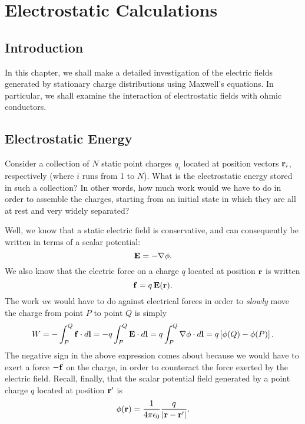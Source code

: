 \chapter{Electrostatic Calculations}\label{estat}

\section{Introduction}
In this chapter, we shall  make a detailed investigation of the
electric fields generated by stationary charge distributions using Maxwell's equations. In particular, we shall examine the interaction of electrostatic
fields with ohmic conductors.

\section{Electrostatic Energy}
Consider a collection of $N$ static point charges $q_i$  located at position vectors
${\bf r}_i$, respectively (where $i$ runs from 1 to $N$). 
What is the electrostatic energy stored in such a collection? In other words, how much work would we have to do in order to assemble
the charges, starting from an initial state in which they are all 
at rest and very widely
separated?

 Well, we know that a static electric field is conservative, and can  consequently
be written in terms of
a scalar potential:
\begin{equation}
{\bf E} = - \nabla\phi.
\end{equation}
We also know that the electric force on a charge $q$  located at position ${\bf r}$ is
written
\begin{equation}
{\bf f} = q\, {\bf E}({\bf r}).
\end{equation}
The work {\em we} would have to do against electrical forces in order to {\em slowly}\/
move the charge from point $P$ to point $Q$ is simply
\begin{equation}\label{e5.3}
W =-  \int_P^Q {\bf f} \cdot d{\bf l} =- q \int_P^Q {\bf E} \cdot d{\bf l} 
=q\int_P^Q \nabla\phi \cdot d{\bf l} = q \left[ \phi(Q) - \phi(P)\right].
\end{equation}
The negative sign in the above expression comes about because we would have to 
exert a force $-{\bf f}$ on the charge, in order to counteract the force
exerted by the electric field. Recall, finally, that the scalar potential field
generated by a point charge $q$ located at position ${\bf r}'$ is
\begin{equation}\label{e5.4}
\phi({\bf r})= \frac{1}{4\pi\epsilon_0} \frac{q}{|{\bf r} - {\bf r}'|}.
\end{equation}

